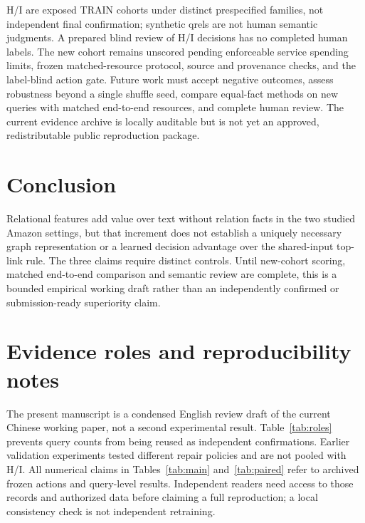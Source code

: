 \documentclass{article}
\begin{document}
H/I are exposed TRAIN cohorts under distinct prespecified families, not
independent final confirmation; synthetic qrels are not human semantic
judgments. A prepared blind review of H/I decisions has no completed human
labels. The new cohort remains unscored pending enforceable service spending
limits, frozen matched-resource protocol, source and provenance checks, and
the label-blind action gate. Future work must accept negative outcomes,
assess robustness beyond a single shuffle seed, compare equal-fact methods
on new queries with matched end-to-end resources, and complete human review.
The current evidence archive is locally auditable but is not yet an approved,
redistributable public reproduction package.

\section{Conclusion}
Relational features add value over text without relation facts in the two
studied Amazon settings, but that increment does not establish a uniquely
necessary graph representation or a learned decision advantage over the
shared-input top-link rule. The three claims require distinct controls.
Until new-cohort scoring, matched end-to-end comparison and semantic review
are complete, this is a bounded empirical working draft rather than an
independently confirmed or submission-ready superiority claim.




\appendix
\section{Evidence roles and reproducibility notes}
The present manuscript is a condensed English review draft of the current
Chinese working paper, not a second experimental result. Table~\ref{tab:roles}
prevents query counts from being reused as independent confirmations. Earlier
validation experiments tested different repair policies and are not pooled
with H/I. All numerical claims in Tables~\ref{tab:main} and~\ref{tab:paired}
refer to archived frozen actions and query-level results. Independent readers
need access to those records and authorized data before claiming a full
reproduction; a local consistency check is not independent retraining.
\end{document}
